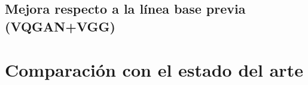 \subsection{Mejora respecto a la línea base previa (VQGAN+VGG)}

\begin{table}[H]
\centering
{}
\caption[Mejora a través de las variantes]{Comparativo con el baseline histórico VQGAN+VGG 
(medido), Ridge Lineal (en evaluación) y Ridge Estocástico (en calibración) sobre $S_{01}$. 
El baseline VQGAN+VGG figura sólo como referencia histórica del campo; no es la arquitectura 
que ejecuta esta tesis.}
\label{table:phase1_vs_phase2}
\end{table}

\section{Comparación con el estado del arte}

